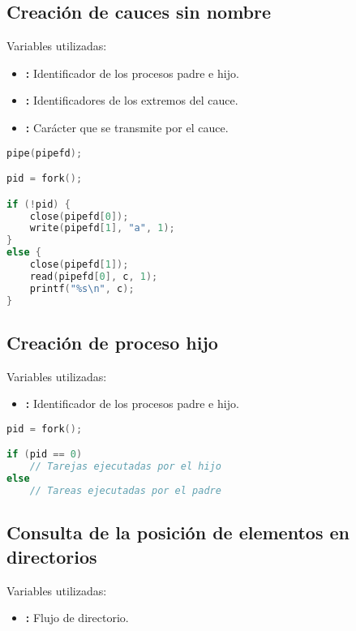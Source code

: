 \pagebreak

\subsection{Creación de cauces sin nombre}

Variables utilizadas:

\begin{itemize}
	\item{}\textbf{:} Identificador de los procesos padre e hijo.
	\item{}\textbf{:} Identificadores de los extremos del cauce.
	\item{}\textbf{:} Carácter que se transmite por el cauce.
\end{itemize}

\begin{lstlisting}[language=C]
pipe(pipefd);

pid = fork();

if (!pid) {
	close(pipefd[0]);
	write(pipefd[1], "a", 1);
}
else {
	close(pipefd[1]);
	read(pipefd[0], c, 1);
	printf("%s\n", c);
}
\end{lstlisting}

\subsection{Creación de proceso hijo}

Variables utilizadas:

\begin{itemize}
	\item{}\textbf{:} Identificador de los procesos padre e hijo.
\end{itemize}

\begin{lstlisting}[language=C]
pid = fork();

if (pid == 0)
	// Tarejas ejecutadas por el hijo
else
	// Tareas ejecutadas por el padre
\end{lstlisting}

\subsection{Consulta de la posición de elementos en directorios}

Variables utilizadas:

\begin{itemize}
	\item{}\textbf{:} Flujo de directorio.
\end{itemize}

